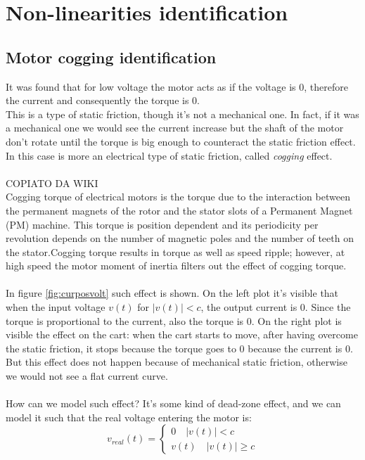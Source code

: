 \chapter{Non-linearities identification}

\section{Motor cogging identification}
It was found that for low voltage the motor acts as if the voltage is $0$, therefore the current and consequently the torque is $0$.\\
This is  a type of static friction, though it's not a mechanical one. In fact, if it was a mechanical one we would see the current increase but the shaft of the motor don't rotate until the torque is big enough to counteract the static friction effect. In this case is more an electrical type of static friction, called \emph{cogging} effect. \\ \\
COPIATO DA WIKI \\
Cogging torque of electrical motors is the torque due to the interaction between the permanent magnets of the rotor and the stator slots of a Permanent Magnet (PM) machine. This torque is position dependent and its periodicity per revolution depends on the number of magnetic poles and the number of teeth on the stator.Cogging torque results in torque as well as speed ripple; however, at high speed the motor moment of inertia filters out the effect of cogging torque.
\\ \\
In figure \ref{fig:curposvolt} such effect is shown. On the left plot it's visible that when the input voltage $v(t)$ for $|v(t)|< c$, the output current is $0$. Since the torque is proportional to the current, also the torque is $0$. On the right plot is visible the effect on the cart: when the cart starts to move, after having overcome the static friction, it stops because the torque goes to $0$ because the current is $0$. But this effect does not happen because of mechanical static friction, otherwise we would not see a flat current curve.  \\ \\
How can we model such effect? It's some kind of dead-zone effect, and we can model it such that the real voltage entering the motor is:
\begin{equation}
v_{real}(t) = \begin{cases}
0 \quad |v(t)| < c \\
v(t) \quad |v(t)| \geq c
\end{cases}
\end{equation}
